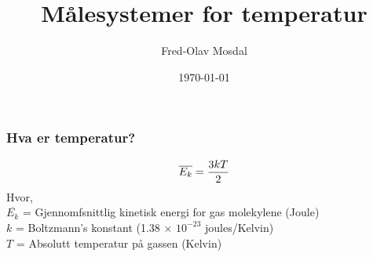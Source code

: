 \documentclass[aspectratio=169,xcolor=dvipsnames]{beamer}
\title[Temperatur]{Målesystemer for temperatur} %
\author[Fred-Olav] {Fred-Olav Mosdal}
\institute[Gand VGS] %
{
    Gand VGS \\
    VG3 Automasjon
}
\date{\today} %
\begin{document}
\begin{frame}
\titlepage
\end{frame}
%
%
\begin{frame}
	\frametitle{Hva er temperatur?}

$$\overline{E_k} = {3 k T \over 2}$$
%
Hvor,\\
%
	$\overline{E_k}$ = Gjennomfsnittlig kinetisk energi for gas molekylene (Joule)\\
%
$k$ = Boltzmann's konstant (1.38 $\times$ $10^{-23}$ joules/Kelvin)\\
%
$T$ = Absolutt temperatur på gassen (Kelvin)\\
%
%
\end{frame}
\end{document}
